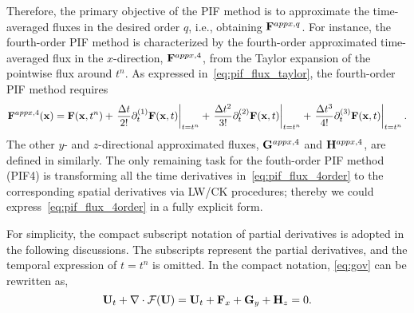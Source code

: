 Therefore, the primary objective of the PIF method is to approximate the time-averaged fluxes
in the desired order \( q \), i.e., obtaining \( \mathbf{F}^{appx, q} \).
For instance, the fourth-order PIF method is characterized by
the fourth-order approximated time-averaged flux in the \( x \)-direction, \( \mathbf{F}^{appx,4} \),
from the Taylor expansion of the pointwise flux around \( t^{n} \).
As expressed in~\cref{eq:pif_flux_taylor}, the fourth-order PIF method requires
\begin{equation}\label{eq:pif_flux_4order}
\mathbf{F}^{appx, 4} (\mathbf{x})
    = \mathbf{F} (\mathbf{x}, t^{n})
        + \left. \frac{\Delta t}{2!} \partial_{t}^{(1)} \mathbf{F} (\mathbf{x}, t) \right|_{t = t^{n}}
        + \left. \frac{\Delta t^{2}}{3!} \partial_{t}^{(2)} \mathbf{F} (\mathbf{x}, t) \right|_{t = t^{n}}
        + \left. \frac{\Delta t^{3}}{4!} \partial_{t}^{(3)} \mathbf{F} (\mathbf{x}, t) \right|_{t = t^{n}}.
\end{equation}
The other \( y \)- and \( z \)-directional approximated fluxes,
\( \mathbf{G}^{appx, 4} \) and \( \mathbf{H}^{appx, 4} \),
are defined in similarly.
The only remaining task for the fouth-order PIF method (PIF4) is transforming all the
time derivatives in~\cref{eq:pif_flux_4order} to the corresponding spatial derivatives
via LW/CK procedures;
thereby we could express~\cref{eq:pif_flux_4order} in a fully explicit form.

For simplicity, the compact subscript notation of partial derivatives is adopted
in the following discussions.
The subscripts represent the partial derivatives,
and the temporal expression of \( t = t^{n} \) is omitted.
In the compact notation, \cref{eq:gov} can be rewritten as,
\begin{equation}\label{eq:pif_gov_compact_notation}
    \mathbf{U}_{t} + \nabla \cdot \mathcal{F}(\mathbf{U}) = \mathbf{U}_{t} + \mathbf{F}_{x} + \mathbf{G}_{y} + \mathbf{H}_{z} = 0.
\end{equation}

